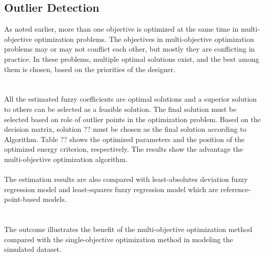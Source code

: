 \documentclass{IJFS}
\begin{document}
\subsection{Outlier Detection}\label{Sub2}
As noted earlier, more than one objective is optimized at the same time in multi-objective optimization problems.
The objectives in multi-objective optimization problems may or may not conflict each other, but mostly they are conflicting in practice.
In these problems, multiple optimal solutions exist, and the best among them is chosen, based on the priorities of the designer.  \\\\\\




All the estimated fuzzy coefficients are optimal solutions and a superior  solution to others   can be selected as a feasible solution.
The final solution must be selected based on role of outlier points in the optimization problem.
Based on the decision matrix, solution ?? must be chosen as the final solution according to Algorithm.
Table ?? shows the optimized parameters and the position of the optimized energy criterion, respectively.
The results show the advantage the multi-objective optimization algorithm.\\\\

The estimation results are also compared with  least-absolutes deviation fuzzy regression model and least-squares fuzzy regression model which are  reference-point-based models.\\\\\\

The outcome illustrates the benefit of the multi-objective optimization method compared with the single-objective optimization method in modeling the simulated dataset.
\end{document}

